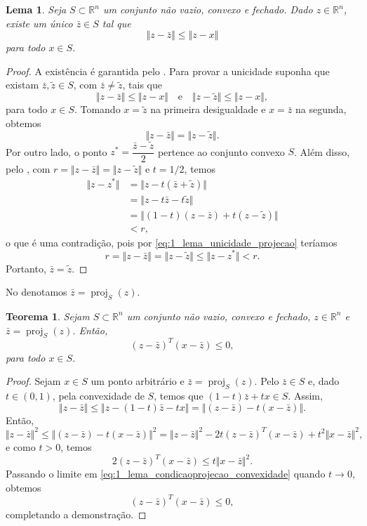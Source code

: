 \documentclass[12pt,a4paper]{scrartcl}
\DeclareMathOperator{\proj}{proj}
\def\RR{\mathds{R}}
\newtheorem{teo}{Teorema}
\newtheorem{lema}{Lema}
\theoremstyle{definition}%
\begin{document}
\begin{lema}  \label{lema:unicidadeprojecao_convexidade}
Seja $S \subset \RR^{n}$ um conjunto não vazio, convexo e fechado. Dado $z \in \RR^{n}$, existe um único $\bar{z} \in S$ tal que
\[
\Vert z - \bar{z} \Vert \leq \Vert z - x \Vert
\]
para todo $x \in S$.
\end{lema}
\begin{proof}
A existência é garantida pelo . Para provar a unicidade suponha que existam $\bar{z}, \tilde{z} \in S$, com $\bar{z} \neq \tilde{z}$, ta{}is que
\[ \label{eq:1_lema_unicidade_projecao}
\Vert z-\bar{z} \Vert \leq \Vert z-x \Vert \quad \text{e} \quad \Vert z-\tilde{z} \Vert \leq \Vert z-x \Vert ,
\]
para todo $x \in S$. Tomando $x=\tilde{z}$ na primeira desigualdade e $x=\bar{z}$ na segunda, obtemos
\[
\Vert z-\bar{z} \Vert = \Vert z-\tilde{z} \Vert .
\]
Por outro lado, o ponto $z^{*} = \dfrac{\bar{z} - \tilde{z}}{2}$ pertence ao conjunto convexo $S$. Além disso, pelo , com $r= \Vert z-\bar{z} \Vert = \Vert z - \tilde{z} \Vert$ e $t=1/2$, temos
\begin{align}
\Vert z-z^{*} \Vert &=  \Vert z-t(\bar{z}+\tilde{z}) \Vert \\
& = \Vert z - t\bar{z} - t\tilde{z} \Vert \\
& = \Vert (1-t)(z-\bar{z}) + t(z-\tilde{z}) \Vert \\
& < r ,
\end{align}
o que é uma contradição, pois por \eqref{eq:1_lema_unicidade_projecao} teríamos
\[
r = \Vert z-\bar{z} \Vert = \Vert z - \tilde{z} \Vert \leq \Vert z-z^{*} \Vert < r .
\]
Portanto, $\bar{z} = \tilde{z}$.
\end{proof}


No  denotamos $\bar{z} = \proj_{S} (z)$.


\begin{teo}  \label{lema_condicaoprojecao_convexidade}
Sejam $S \subset \RR^{n}$ um conjunto não vazio, convexo e fechado, $z \in \RR^{n}$ e $\bar{z} = \proj_{S} (z)$. Então, 
\[
(z - \bar{z})^{T}(x - \bar{z}) \leq 0 ,
\]
para todo $x \in S$.
\end{teo}
\begin{proof}
Sejam $x \in S$ um ponto arbitrário e $\bar{z} = \proj_{S} (z)$. Pelo  $\bar{z} \in S$ e, dado $t \in (0,1)$, pela convexidade de $S$, temos que $(1-t)\bar{z} + tx \in S$. Assim, 
\[
\Vert z-\bar{z} \Vert \leq \Vert z-(1-t)\bar{z} - tx \Vert = \Vert (z-\bar{z}) - t(x-\bar{z}) \Vert.
\]
Então, 
\[
\Vert z-\bar{z} \Vert^{2} \leq \Vert (z-\bar{z}) - t(x-\bar{z}) \Vert^{2} = \Vert z-\bar{z} \Vert^{2} - 2t(z-\bar{z})^{T}(x-\bar{z}) + t^{2}\Vert x- \bar{z} \Vert^{2} ,
\]
e como $t>0$, temos
\[ \label{eq:1_lema_condicaoprojecao_convexidade}
2(z-\bar{z})^{T}(x-\bar{z}) \leq t \Vert x- \bar{z} \Vert^{2} .
\]
Passando o limite em \eqref{eq:1_lema_condicaoprojecao_convexidade} quando $t\rightarrow 0$, obtemos
\[
(z-\bar{z})^{T}(x-\bar{z}) \leq 0, 
\]
completando a demonstração.
\end{proof}
\end{document}
